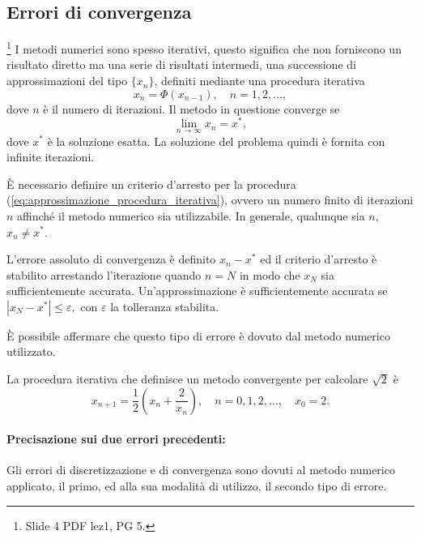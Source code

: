 \subsection{Errori di convergenza}\label{ssec:errori_convergenza}
\footnote{Slide 4 PDF lez1, PG 5.} I metodi numerici sono spesso iterativi, questo significa che non forniscono un risultato diretto ma una serie di risultati intermedi, una successione di approssimazioni del tipo $\{x_n\}$, definiti mediante una procedura iterativa
\begin{equation}\label{eq:approssimazione_procedura_iterativa}
	x_n=\Phi(x_{n-1}),\quad n=1,2,\hdots,
\end{equation}
dove $n$ è il numero di iterazioni. Il metodo in questione converge se
\begin{equation}
	\lim_{n\rightarrow\infty}x_n=x^*,
\end{equation}
dove $x^*$ è la soluzione esatta. La soluzione del problema quindi è fornita con infinite iterazioni.

È necessario definire un criterio d'arresto per la procedura (\ref{eq:approssimazione_procedura_iterativa}), ovvero un numero finito di iterazioni $n$ affinché il metodo numerico sia utilizzabile. In generale, qualunque sia $n$, $x_n\neq x^*$.

L'errore assoluto di convergenza è definito $x_n-x^*$ ed il criterio d'arresto è stabilito arrestando l'iterazione quando $n=N$ in modo che $x_N$ sia sufficientemente accurata. Un'approssimazione è sufficientemente accurata se $|x_N-x^*|\leq\varepsilon,$ con $\varepsilon$ la tolleranza stabilita.

È possibile affermare che questo tipo di errore è dovuto dal metodo numerico utilizzato.

\begin{example}
	La procedura iterativa che definisce un metodo convergente per calcolare $\sqrt{2}$ è
	\begin{equation}\label{eq:approssimazione_radice_2_procedura_iterativa}
		x_{n+1}=\frac{1}{2}\left(x_n+\frac{2}{x_n}\right),\quad n=0,1,2,\hdots,\quad x_0=2.
	\end{equation}
\end{example}

\paragraph{Precisazione sui due errori precedenti:} Gli errori di discretizzazione e di convergenza sono dovuti al metodo numerico applicato, il primo, ed alla sua modalità di utilizzo, il secondo tipo di errore.

